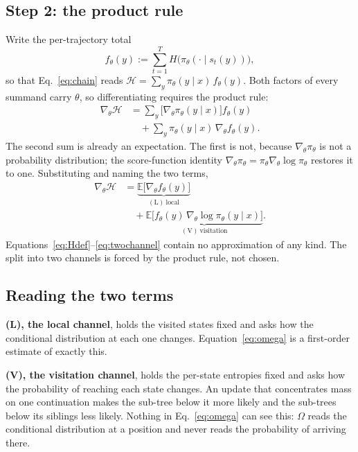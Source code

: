 \documentclass[11pt]{article}
\newcommand{\Htraj}{\mathcal{H}}
\newcommand{\Om}{\Omega}
\newcommand{\E}{\mathbb{E}}
\newcommand{\gradt}{\nabla_{\theta}}
\newcommand{\pit}{\pi_{\theta}}
\begin{document}
\subsection{Step 2: the product rule}

Write the per-trajectory total
%
\begin{equation}
f_\theta(y) := \sum_{t=1}^{T} H\bigl(\pit(\cdot \mid s_t(y))\bigr),
\label{eq:fdef}
\end{equation}
%
so that Eq.~\eqref{eq:chain} reads
$\Htraj = \sum_y \pit(y \mid x)\, f_\theta(y)$. Both factors of every summand carry
$\theta$, so differentiating requires the product rule:
%
\begin{equation}
\begin{split}
\gradt \Htraj
&= \sum_y \bigl[\gradt \pit(y \mid x)\bigr] f_\theta(y)\\
&\quad + \sum_y \pit(y \mid x)\, \gradt f_\theta(y).
\end{split}
\label{eq:productrule}
\end{equation}
%
The second sum is already an expectation. The first is not, because
$\gradt \pit$ is not a probability distribution; the score-function identity
$\gradt \pit = \pit \gradt \log \pit$ restores it to one. Substituting and naming
the two terms,
%
\begin{equation}
\begin{split}
\gradt \Htraj
&= \underbrace{\E\bigl[\gradt f_\theta(y)\bigr]}_{(\mathrm{L})\ \text{local}}\\
&\quad + \underbrace{\E\bigl[f_\theta(y)\,\gradt \log \pit(y \mid x)\bigr]}_{(\mathrm{V})\ \text{visitation}}.
\end{split}
\label{eq:twochannel}
\end{equation}
%
Equations~\eqref{eq:Hdef}--\eqref{eq:twochannel} contain no approximation of any
kind. The split into two channels is forced by the product rule, not chosen.

\subsection{Reading the two terms}

\textbf{(L), the local channel}, holds the visited states fixed and asks how the
conditional distribution at each one changes. Equation~\eqref{eq:omega} is a
first-order estimate of exactly this.

\textbf{(V), the visitation channel}, holds the per-state entropies fixed and asks
how the probability of reaching each state changes. An update that concentrates mass
on one continuation makes the sub-tree below it more likely and the sub-trees below
its siblings less likely. Nothing in Eq.~\eqref{eq:omega} can see this: $\Om$ reads
the conditional distribution at a position and never reads the probability of
arriving there.
\end{document}
